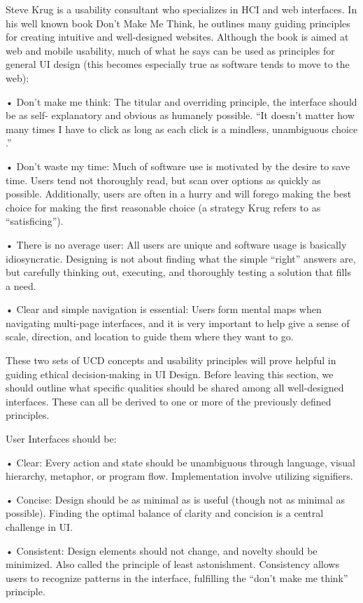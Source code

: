 \documentclass[12pt, oneside]{article}
\begin{document}
Steve Krug is a usability consultant who specializes in HCI and web interfaces. In his well known book Don't Make Me Think, he outlines many guiding principles for creating intuitive and well-designed websites. Although the book is aimed at web and mobile usability, much of what he says can be used as principles for general UI design (this becomes especially true as software tends to move to the web):

• Don't make me think: The titular and overriding principle, the interface should be as self- explanatory and obvious as humanely possible. ``It doesn't matter how many times I have to click as long as each click is a mindless, unambiguous choice \cite[p.~43]{krug_2014}.''

• Don't waste my time: Much of software use is motivated by the desire to save time. Users tend not thoroughly read, but scan over options as quickly as possible. Additionally, users are often in a hurry and will forego making the best choice for making the first reasonable choice (a strategy Krug refers to as ``satisficing'').

• There is no average user: All users are unique and software usage is basically idiosyncratic. Designing is not about finding what the simple ``right'' answers are, but carefully thinking out, executing, and thoroughly testing a solution that fills a need.

• Clear and simple navigation is essential: Users form mental maps when navigating multi-page interfaces, and it is very important to help give a sense of scale, direction, and location to guide them where they want to go.

These two sets of UCD concepts and usability principles will prove helpful in guiding ethical decision-making in UI Design. Before leaving this section, we should outline what specific qualities should be shared among all well-designed interfaces. These can all be derived to one or more of the previously defined principles.

User Interfaces should be:

• Clear: Every action and state should be unambiguous through language, visual hierarchy,
metaphor, or program flow. Implementation involve utilizing signifiers.

• Concise: Design should be as minimal as is useful (though not as minimal as possible). Finding the optimal balance of clarity and concision is a central challenge in UI.

• Consistent: Design elements should not change, and novelty should be minimized. Also called the principle of least astonishment. Consistency allows users to recognize patterns in the interface, fulfilling the ``don't make me think'' principle.
\end{document}
